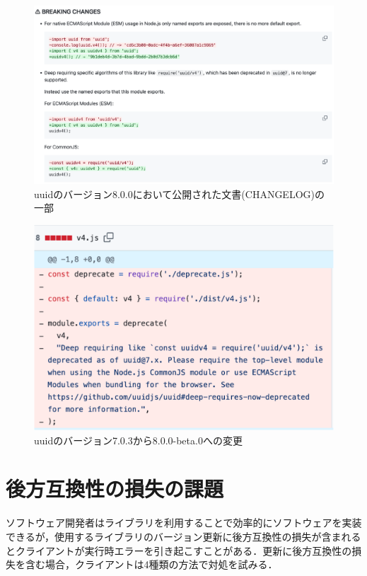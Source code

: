 \documentclass[11pt]{jreport}
\begin{document}
\begin{figure}[t]
\centerline{\includegraphics[width=0.9\linewidth]{BSthesis2024_Iida_fig/GoodDocumentation.pdf}}
\caption{uuidのバージョン8.0.0において公開された文書(CHANGELOG)の一部}
\label{fig:good_documentation}
\end{figure}

\begin{figure}[t]
\centerline{\includegraphics[width=0.75\linewidth]{@BSthesis2024_Iida/BSthesis2024_Iida_fig/uuid_library_code.pdf}}
\caption{uuidのバージョン7.0.3から8.0.0-beta.0への変更}
\label{fig:uuid_example}
\end{figure}

\section{後方互換性の損失の課題}
ソフトウェア開発者はライブラリを利用することで効率的にソフトウェアを実装できるが，使用するライブラリのバージョン更新に後方互換性の損失が含まれるとクライアントが実行時エラーを引き起こすことがある．更新に後方互換性の損失を含む場合，クライアントは4種類の方法で対処を試みる\cite{DependedOnYou}．
\end{document}
